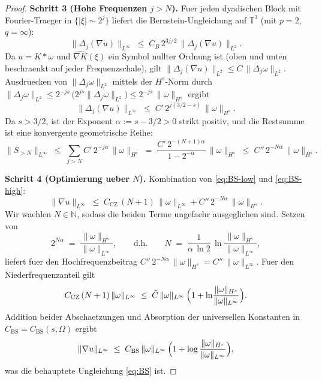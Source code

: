 \documentclass[12pt,a4paper]{article}
\theoremstyle{definition}
\theoremstyle{plain}
\theoremstyle{remark}
\begin{document}
\begin{proof}
\medskip
\noindent\textbf{Schritt 3 (Hohe Frequenzen $j > N$).}
Fuer jeden dyadischen Block mit Fourier-Traeger in $\{|\xi| \sim 2^j\}$ liefert die
Bernstein-Ungleichung auf $\mathbb{T}^3$ (mit $p=2$, $q=\infty$):
\[
    \|\Delta_j(\nabla u)\|_{L^\infty}
    \;\le\; C_B\,2^{3j/2}\,\|\Delta_j(\nabla u)\|_{L^2}.
\]
Da $u = K * \omega$ und $\widehat{\nabla K}(\xi)$ ein Symbol nullter Ordnung ist
(oben und unten beschraenkt auf jeder Frequenzschale), gilt
$\|\Delta_j(\nabla u)\|_{L^2} \le C\,\|\Delta_j \omega\|_{L^2}$.
Ausdruecken von $\|\Delta_j \omega\|_{L^2}$ mittels der $H^s$-Norm
durch $\|\Delta_j\omega\|_{L^2} \le 2^{-js}\,\bigl(2^{js}\|\Delta_j\omega\|_{L^2}\bigr)
\le 2^{-js}\,\|\omega\|_{H^s}$ ergibt
\[
    \|\Delta_j(\nabla u)\|_{L^\infty}
    \;\le\; C'\,2^{j(3/2-s)}\,\|\omega\|_{H^s}.
\]
Da $s > 3/2$, ist der Exponent $\alpha := s - 3/2 > 0$ strikt positiv,
und die Restsumme ist eine konvergente geometrische Reihe:
\begin{equation}\label{eq:BS-high}
    \|S_{>N}\|_{L^\infty}
    \;\le\; \sum_{j>N} C'\,2^{-j\alpha}\,\|\omega\|_{H^s}
    \;=\; \frac{C'\,2^{-(N+1)\alpha}}{1 - 2^{-\alpha}}\,\|\omega\|_{H^s}
    \;\le\; C''\,2^{-N\alpha}\,\|\omega\|_{H^s}.
\end{equation}

\medskip
\noindent\textbf{Schritt 4 (Optimierung ueber $N$).}
Kombination von \eqref{eq:BS-low} und \eqref{eq:BS-high}:
\[
    \|\nabla u\|_{L^\infty}
    \;\le\; C_{\mathrm{CZ}}\,(N+1)\,\|\omega\|_{L^\infty}
          + C''\,2^{-N\alpha}\,\|\omega\|_{H^s}.
\]
Wir waehlen $N \in \mathbb{N}$, sodass die beiden Terme ungefaehr ausgeglichen sind.
Setzen von
\[
    2^{N\alpha} \;=\; \frac{\|\omega\|_{H^s}}{\|\omega\|_{L^\infty}},
    \qquad\text{d.h.}\qquad
    N \;=\; \frac{1}{\alpha\,\ln 2}\,
            \ln\!\frac{\|\omega\|_{H^s}}{\|\omega\|_{L^\infty}},
\]
liefert fuer den Hochfrequenzbeitrag
$C''\,2^{-N\alpha}\,\|\omega\|_{H^s} = C''\,\|\omega\|_{L^\infty}$.
Fuer den Niederfrequenzanteil gilt
\[
    C_{\mathrm{CZ}}\,(N+1)\,\|\omega\|_{L^\infty}
    \;\le\; \tilde C\,\|\omega\|_{L^\infty}\,
            \Bigl(1 + \ln\!\frac{\|\omega\|_{H^s}}{\|\omega\|_{L^\infty}}\Bigr).
\]
Addition beider Abschaetzungen und Absorption der universellen Konstanten in
$C_{\mathrm{BS}} = C_{\mathrm{BS}}(s,\Omega)$ ergibt
\[
    \|\nabla u\|_{L^\infty}
    \;\le\;
    C_{\mathrm{BS}}\,\|\omega\|_{L^\infty}\,
    \Bigl(1 + \log\frac{\|\omega\|_{H^s}}{\|\omega\|_{L^\infty}}\Bigr),
\]
was die behauptete Ungleichung \eqref{eq:BS} ist.
\end{proof}
\end{document}

